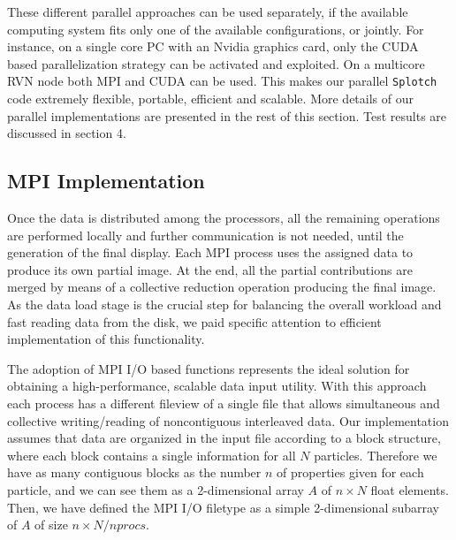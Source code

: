\documentclass[1p,times]{elsarticle}
\begin{document}
These different parallel approaches can be used separately, 
if the available computing system fits only one of the available configurations, or jointly. 
For instance, on a single core PC with an Nvidia graphics card, only the CUDA based
parallelization strategy can be activated and exploited. On a multicore RVN \cite{rvn} 
node both MPI and CUDA can be used. This makes our parallel {\tt Splotch} code 
extremely flexible, portable, efficient and scalable. More details of our parallel implementations are presented in the rest of this section. Test results are discussed in section 4.

\subsection{MPI Implementation}
\label{mpi}

Once the data is distributed among the processors, all the remaining operations 
are performed locally and further communication is not needed, until the generation
of the final display. Each MPI process uses the assigned 
data to produce its own partial image. At the end, all the partial contributions are merged by means of a
collective reduction operation producing the final image. As the data load stage is the crucial step for balancing the overall workload and fast reading
data from the disk, we paid specific attention to efficient implementation of this functionality.

The adoption of MPI I/O based functions represents the ideal solution for obtaining
a high-performance, scalable data input utility.
With this approach each process has a different fileview of a single file 
that allows simultaneous and collective
writing/reading of noncontiguous interleaved data. 
Our implementation assumes that data are organized in the input file according to a block structure, 
where each block contains a single information for 
all $N$ particles. Therefore we have as many contiguous blocks
as the number $n$ of properties given for each particle, and we can see them as a 2-dimensional array $A$ 
of $n \times N$ float elements. 
Then, we have defined the MPI I/O filetype as a simple 2-dimensional subarray of $A$ 
of size $n \times N/nprocs$.
\end{document}
